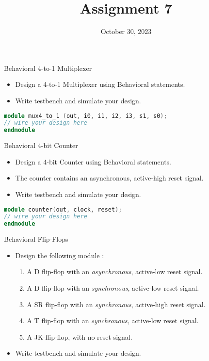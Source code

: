 \documentclass{vhdl-assignment}
\title{Assignment 7}
\date{October 30, 2023}
\begin{document}
\maketitle
\thispagestyle{fancy}

\begin{problem}{Behavioral 4-to-1 Multiplexer}
    \begin{itemize}
        \item Design a 4-to-1 Multiplexer using Behavioral statements.
        \item Write testbench and simulate your design.
    \end{itemize}

    \begin{lstlisting}[language=Verilog, numbers=none]
module mux4_to_1 (out, i0, i1, i2, i3, s1, s0);
// wire your design here
endmodule
\end{lstlisting}
\end{problem}

\begin{problem}{Behavioral 4-bit Counter}
    \begin{itemize}
        \item Design a 4-bit Counter using Behavioral statements.
        \item The counter contains an asynchronous, active-high reset signal.
        \item Write testbench and simulate your design.
    \end{itemize}
        \begin{lstlisting}[language=Verilog, numbers=none]
module counter(out, clock, reset);
// wire your design here
endmodule
\end{lstlisting}
\end{problem}

\begin{problem}{Behavioral Flip-Flops}
    \begin{itemize}
        \item Design the following module :
        \begin{enumerate}
            \item A D flip-flop with an \emph{asynchronous}, active-low reset signal.
            \item A D flip-flop with an \emph{synchronous}, active-low reset signal.
            \item A SR flip-flop with an \emph{synchronous}, active-high reset signal.
            \item A T flip-flop with an \emph{synchronous}, active-low reset signal.
            \item A JK-flip-flop, with no reset signal.
        \end{enumerate}
        \item Write testbench and simulate your design.
    \end{itemize}
\end{problem}
\end{document}
